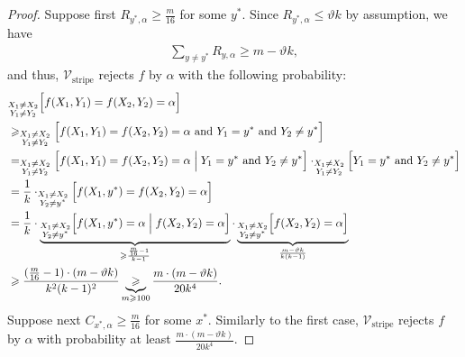 \documentclass[11pt,fleqn]{article}
\renewcommand{\geq}{\geqslant}
\renewcommand{\leq}{\leqslant}
\renewcommand{\theta}{\vartheta}
\newcommand{\V}{\calV}
\newcommand{\f}{f}
\newcommand{\Vstripe}{\V_\mathrm{stripe}}
\newcommand{\calV}{\mathcal{V}}
\let\Pr\relax\DeclareMathOperator*{\Pr}{\mathbb{P}}
\theoremstyle{definition}
\numberwithin{equation}{section}
\begin{document}
\begin{proof}
Suppose first $R_{y^*,\alpha} \geq \frac{m}{16}$ for some $y^*$.
Since $R_{y^*,\alpha} \leq \theta k$ by assumption, we have
\begin{align}
    \sum_{y \neq y^*} R_{y,\alpha} \geq m-\theta k,
\end{align}
and thus, $\Vstripe$ rejects $\f$ by $\alpha$ with the following probability:
\begin{align}
\begin{aligned}
    & \Pr_{\substack{X_1 \neq X_2 \\ Y_1 \neq Y_2}}\Bigl[ \f(X_1,Y_1) = \f(X_2,Y_2) = \alpha \Bigr] \\
    & \geq \Pr_{\substack{X_1 \neq X_2 \\ Y_1 \neq Y_2}}\Bigl[
        \f(X_1,Y_1) = \f(X_2,Y_2) = \alpha \text{ and }
        Y_1 = y^* \text{ and }
        Y_2 \neq y^*
    \Bigr] \\
    & = \Pr_{\substack{X_1 \neq X_2 \\ Y_1 \neq Y_2}}\Bigl[
        \f(X_1,Y_1) = \f(X_2,Y_2) = \alpha \Bigm|
        Y_1 = y^* \text{ and } Y_2 \neq y^*
    \Bigr] \cdot \Pr_{\substack{X_1 \neq X_2 \\ Y_1 \neq Y_2}}\Bigl[ Y_1 = y^* \text{ and } Y_2 \neq y^* \Bigr] \\
    & = \frac{1}{k} \cdot \Pr_{\substack{X_1 \neq X_2 \\ Y_2 \neq y^*}}\Bigl[
        \f(X_1,y^*) = \f(X_2,Y_2) = \alpha
    \Bigr] \\
    & = \frac{1}{k} \cdot \underbrace{\Pr_{\substack{X_1 \neq X_2 \\ Y_2 \neq y^*}}\Bigl[
        \f(X_1, y^*) = \alpha \Bigm| \f(X_2, Y_2) = \alpha
    \Bigr]}_{\geq \frac{\frac{m}{16}-1}{k-1}} \cdot 
    \underbrace{\Pr_{\substack{X_1 \neq X_2 \\ Y_2 \neq y^*}}\Bigl[
        \f(X_2,Y_2) = \alpha
    \Bigr]}_{\frac{m-\theta k}{k(k-1)}} \\
    & \geq \frac{(\frac{m}{16}-1)\cdot (m-\theta k)}{k^2(k-1)^2}
    \underbrace{\geq}_{m \geq 100} \frac{m \cdot (m-\theta k)}{20 k^4}.
\end{aligned}
\end{align}
Suppose next $C_{x^*,\alpha} \geq \frac{m}{16}$ for some $x^*$.
Similarly to the first case,
$\Vstripe$ rejects $\f$ by $\alpha$ with probability at least $\frac{m \cdot (m-\theta k)}{20 k^4}$.



\end{proof}
\end{document}
